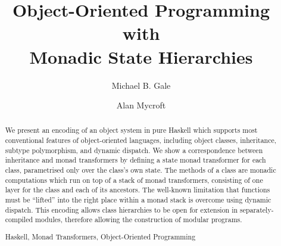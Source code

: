 \documentclass[runningheads,a4paper]{llncs}
\newcommand{\keywords}[1]{\par\addvspace\baselineskip
\noindent\keywordname\enspace\ignorespaces#1}
\begin{document}
\mainmatter  %

\title{Object-Oriented Programming with\\Monadic State Hierarchies}


%
%
\author{Michael B. Gale \and Alan Mycroft}
%


%
%

\maketitle


\begin{abstract}
We present an encoding of an object system in pure Haskell which supports most conventional features of object-oriented languages, including object classes, inheritance, subtype polymorphism, and dynamic dispatch. We show a correspondence between inheritance and monad transformers by defining a state monad transformer for each class, parametrised only over the class's own state. The methods of a class are monadic computations which run on top of a stack of monad transformers, consisting of one layer for the class and each of its ancestors. The well-known limitation that functions must be ``lifted'' into the right place within a monad stack is overcome using dynamic dispatch. This encoding allows class hierarchies to be open for extension in separately-compiled modules, therefore allowing the construction of modular programs. 

\keywords{Haskell, Monad Transformers, Object-Oriented Programming}
\end{abstract}
\end{document}
